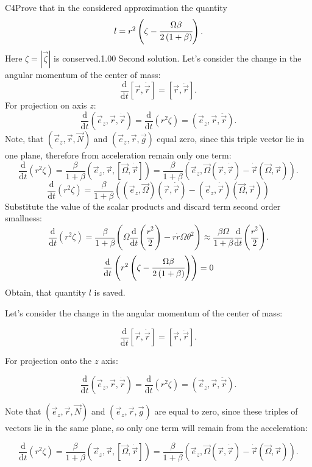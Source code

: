 \documentclass[11pt,a4paper]{article}
\begin{document}
\begin{solcard}{C4}{Prove that in the considered approximation the quantity $$ l = r^2 \left( \zeta-\cfrac{\Omega\beta}{2\left(1+\beta\right)} \right). $$Here $\zeta = |\vec{\zeta}|$ is conserved.}{1.00}
Second solution. Let's consider the change in the angular momentum of the center of mass: $$\frac{\text{d}}{\text{d}t}\left[\vec r, \dot{\vec r}\right] = \left[\vec r, \ddot{\vec r}\right].$$ For projection on axis $z$: $$\frac{\text{d}}{\text{d}t}\left(\vec e_z, \vec r, \dot{\vec r}\right) = \frac{\text{d}}{\text{d}t}\left(r^2\zeta\right) = \left(\vec e_z, \vec r, \ddot{\vec r}\right).$$ Note, that $\left(\vec e_z, \vec r, \vec N\right)$ and $\left(\vec e_z, \vec r, \vec g\right)$ equal zero, since this triple vector lie in one plane, therefore from acceleration remain only one term: $$\frac{\text{d}}{\text{d}t}\left(r^2\zeta\right) = \frac{\beta}{1+\beta} \left(\vec e_z, \vec r,  [\vec \Omega, \dot{\vec r}]\right) = \frac{\beta}{1+\beta} \left(\vec e_z, \vec\Omega\left(\vec r,\dot{\vec r}\right) - \dot{\vec r} \left(\vec\Omega, \vec r\right)\right).$$ $$\frac{\text{d}}{\text{d}t}\left(r^2\zeta\right) = \frac{\beta}{1+\beta} \left(\left(\vec e_z, \vec\Omega\right)\left(\vec r,\dot{\vec r}\right) - \left(\vec e_z,\dot{\vec r}\right) \left(\vec\Omega, \vec r\right)\right)$$ Substitute the value of the scalar products and discard term second order smallness: $$\frac{\text{d}}{\text{d}t}\left(r^2\zeta\right) = \frac{\beta}{1+\beta} \left(\Omega\frac{\text{d}}{\text{d}t}\left(\frac{r^2}{2}\right) - r\dot{r}\Omega \theta^2\right) \approx \frac{\beta\Omega}{1+\beta}\frac{\text{d}}{\text{d}t}\left(\frac{r^2}{2}\right) .$$ $$\frac{\text{d}}{\text{d}t}\left(r^2 \left( \zeta-\cfrac{\Omega\beta}{2\left(1+\beta\right)} \right)\right) = 0$$ Obtain, that quantity $l$ is saved.


Let's consider the change in the angular momentum of the center of mass:


$$\frac{\text{d}}{\text{d}t}\left[\vec r, \dot{\vec r}\right] = \left[\vec r, \ddot{\vec r}\right].$$


For projection onto the $z$ axis:


$$\frac{\text{d}}{\text{d}t}\left(\vec e_z, \vec r, \dot{\vec r}\right) = \frac{\text{d}}{\text{d}t}\left(r^2\zeta\right) = \left(\vec e_z, \vec r, \ddot{\vec r}\right).$$


Note that $\left(\vec e_z, \vec r, \vec N\right)$ and $\left(\vec e_z, \vec r, \vec g\right)$ are equal to zero, since these triples of vectors lie in the same plane, so only one term will remain from the acceleration:


$$\frac{\text{d}}{\text{d}t}\left(r^2\zeta\right) = \frac{\beta}{1+\beta} \left(\vec e_z, \vec r,  [\vec \Omega, \dot{\vec r}]\right) = \frac{\beta}{1+\beta} \left(\vec e_z, \vec\Omega\left(\vec r,\dot{\vec r}\right) - \dot{\vec r} \left(\vec\Omega, \vec r\right)\right).$$



\end{solcard}
\end{document}
